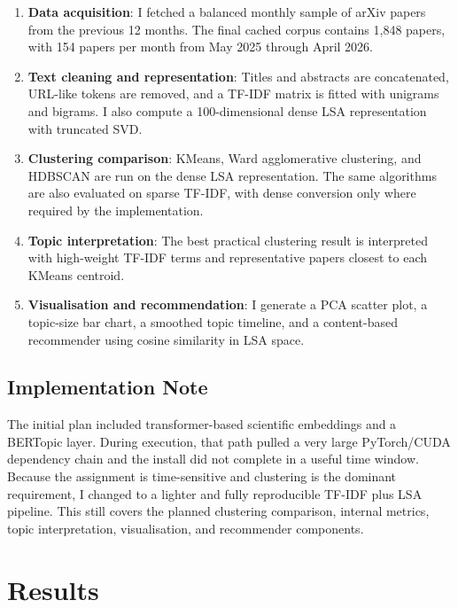 \documentclass[11pt,a4paper]{article}
\begin{document}
\begin{enumerate}[leftmargin=*,itemsep=2pt]
    \item \textbf{Data acquisition}: I fetched a balanced monthly sample of
    arXiv papers from the previous 12 months. The final cached corpus contains
    1,848 papers, with 154 papers per month from May 2025 through April 2026.

    \item \textbf{Text cleaning and representation}: Titles and abstracts are
    concatenated, URL-like tokens are removed, and a TF-IDF matrix is fitted
    with unigrams and bigrams. I also compute a 100-dimensional dense LSA
    representation with truncated SVD.

    \item \textbf{Clustering comparison}: KMeans, Ward agglomerative
    clustering, and HDBSCAN are run on the dense LSA representation. The same
    algorithms are also evaluated on sparse TF-IDF, with dense conversion only
    where required by the implementation.

    \item \textbf{Topic interpretation}: The best practical clustering result
    is interpreted with high-weight TF-IDF terms and representative papers
    closest to each KMeans centroid.

    \item \textbf{Visualisation and recommendation}: I generate a PCA scatter
    plot, a topic-size bar chart, a smoothed topic timeline, and a
    content-based recommender using cosine similarity in LSA space.
\end{enumerate}

\subsection*{Implementation Note}

The initial plan included transformer-based scientific embeddings and a
BERTopic layer. During execution, that path pulled a very large PyTorch/CUDA
dependency chain and the install did not complete in a useful time window.
Because the assignment is time-sensitive and clustering is the dominant
requirement, I changed to a lighter and fully reproducible TF-IDF plus LSA
pipeline. This still covers the planned clustering comparison, internal
metrics, topic interpretation, visualisation, and recommender components.

\section*{Results}
\end{document}
